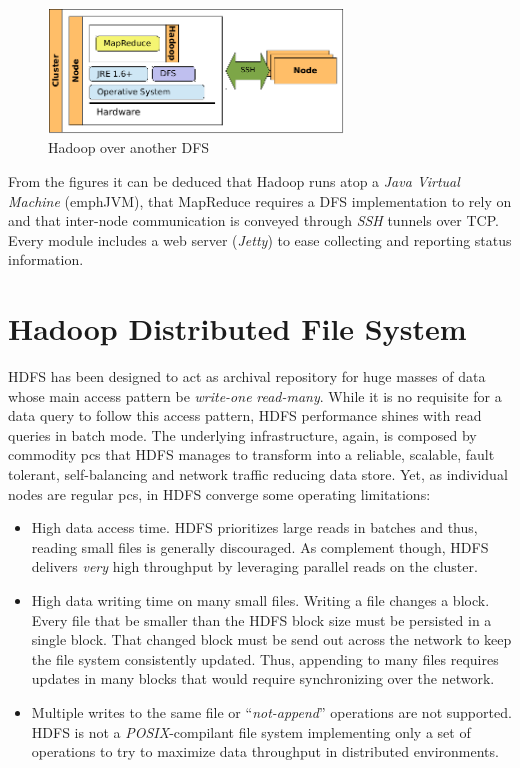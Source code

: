 \begin{figure}[tbp]
\begin{center}
\includegraphics[width=0.7\textwidth]{imagenes/016.pdf}
 \caption{Hadoop over another DFS}
\label{fig:hadoopmapreddfs}
\end{center}
\end{figure}

From the figures it can be deduced that Hadoop runs atop a \emph{Java Virtual Machine} (emph{JVM}), that MapReduce requires a DFS implementation to rely on and that inter-node communication is conveyed through \emph{SSH} tunnels over TCP. Every module includes a web server (\emph{Jetty}) to ease collecting and reporting status information.

\section{Hadoop Distributed File System}\label{sec:hdfs}
\noindent HDFS has been designed to act as archival repository for huge masses of data whose main access pattern be \emph{write-one} \emph{read-many}. While it is no requisite for a data query to follow this access pattern, HDFS performance shines with read queries in batch mode. The underlying infrastructure, again, is composed by commodity pcs that HDFS manages to transform into a reliable, scalable, fault tolerant, self-balancing and network traffic reducing data store. Yet, as individual nodes are regular pcs, in HDFS converge some operating limitations:

\begin{itemize}
 \item High data access time. HDFS prioritizes large reads in batches and thus, reading small files is generally discouraged. As complement though, HDFS delivers \emph{very} high throughput by leveraging parallel reads on the cluster.
 \item High data writing time on many small files. Writing a file changes a block. Every file that be smaller than the HDFS block size must be persisted in a single block. That changed block must be send out across the network to keep the file system consistently updated. Thus, appending to many files requires updates in many blocks that would require synchronizing over the network.
 \item Multiple writes to the same file or ``\emph{not-append}'' operations are not supported. HDFS is not a \emph{POSIX}-compilant file system implementing only a set of operations to try to maximize data throughput in distributed environments.
\end{itemize}

